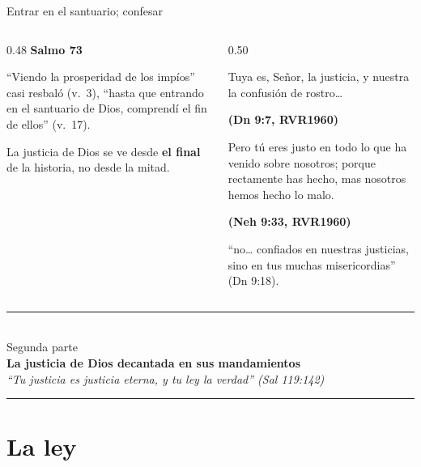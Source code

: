 \documentclass[hyperref={bookmarks=false},aspectratio=169]{beamer}
\newcommand{\fuente}[1]{\par\hfill{\upshape\bfseries\footnotesize\textcolor{azul}{#1}}}
\newcommand{\destacar}[1]{\textbf{\textcolor{azul}{#1}}}
\begin{document}
\begin{frame}{Entrar en el santuario; confesar}
\begin{columns}[t,onlytextwidth]
\begin{column}{0.48\textwidth}
\textbf{\color{azul}Salmo 73}\par\small
``Viendo la prosperidad de los impíos'' casi resbaló (v.~3), ``hasta que entrando en el santuario de Dios, comprendí el fin de ellos'' (v.~17).\par\medskip
La justicia de Dios se ve desde \destacar{el final} de la historia, no desde la mitad.
\end{column}
\begin{column}{0.50\textwidth}
\begin{cita}Tuya es, Señor, la justicia, y nuestra la confusión de rostro\ldots\fuente{(Dn 9:7, RVR1960)}\end{cita}
\begin{cita}Pero tú eres justo en todo lo que ha venido sobre nosotros; porque rectamente has hecho, mas nosotros hemos hecho lo malo.\fuente{(Neh 9:33, RVR1960)}\end{cita}
\scriptsize ``no\ldots{} confiados en nuestras justicias, sino en tus muchas misericordias'' (Dn 9:18).
\end{column}
\end{columns}
\end{frame}

\begin{frame}[plain]
\vfill\centering
{\color{dorado}\rule{0.55\linewidth}{1.2pt}}\\[8pt]
{\large\color{gris}Segunda parte}\\[4pt]
{\LARGE\bfseries\color{azul}La justicia de Dios decantada en sus mandamientos}\\[8pt]
{\small\itshape\color{gris}``Tu justicia es justicia eterna, y tu ley la verdad'' (Sal 119:142)}\\[8pt]
{\color{dorado}\rule{0.55\linewidth}{1.2pt}}
\vfill
\end{frame}

\section{La ley}
\end{document}
